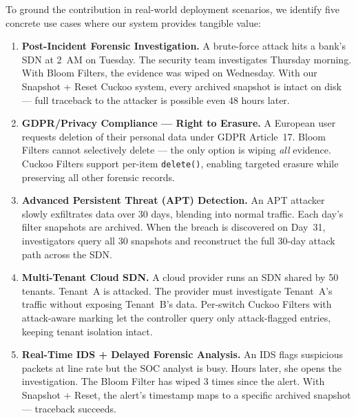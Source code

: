 \documentclass[12pt, a4paper]{report}
\begin{document}
To ground the contribution in real-world deployment scenarios, we identify
five concrete use cases where our system provides tangible value:

\begin{enumerate}[leftmargin=*, label=\textbf{Use Case \arabic*:}]

  \item \textbf{Post-Incident Forensic Investigation.}
  A brute-force attack hits a bank's SDN at 2~AM on Tuesday. The security
  team investigates Thursday morning. With Bloom Filters, the evidence was
  wiped on Wednesday. With our Snapshot + Reset Cuckoo system, every
  archived snapshot is intact on disk --- full traceback to the attacker
  is possible even 48 hours later.

  \item \textbf{GDPR/Privacy Compliance --- Right to Erasure.}
  A European user requests deletion of their personal data under GDPR
  Article~17. Bloom Filters cannot selectively delete --- the only option
  is wiping \textit{all} evidence. Cuckoo Filters support per-item
  \texttt{delete()}, enabling targeted erasure while preserving all
  other forensic records.

  \item \textbf{Advanced Persistent Threat (APT) Detection.}
  An APT attacker slowly exfiltrates data over 30 days, blending into
  normal traffic. Each day's filter snapshots are archived. When the
  breach is discovered on Day~31, investigators query all 30 snapshots
  and reconstruct the full 30-day attack path across the SDN.

  \item \textbf{Multi-Tenant Cloud SDN.}
  A cloud provider runs an SDN shared by 50 tenants. Tenant~A is
  attacked. The provider must investigate Tenant~A's traffic without
  exposing Tenant~B's data. Per-switch Cuckoo Filters with attack-aware
  marking let the controller query only attack-flagged entries, keeping
  tenant isolation intact.

  \item \textbf{Real-Time IDS + Delayed Forensic Analysis.}
  An IDS flags suspicious packets at line rate but the SOC analyst is
  busy. Hours later, she opens the investigation. The Bloom Filter has
  wiped 3 times since the alert. With Snapshot + Reset, the alert's
  timestamp maps to a specific archived snapshot --- traceback succeeds.

\end{enumerate}
\end{document}
